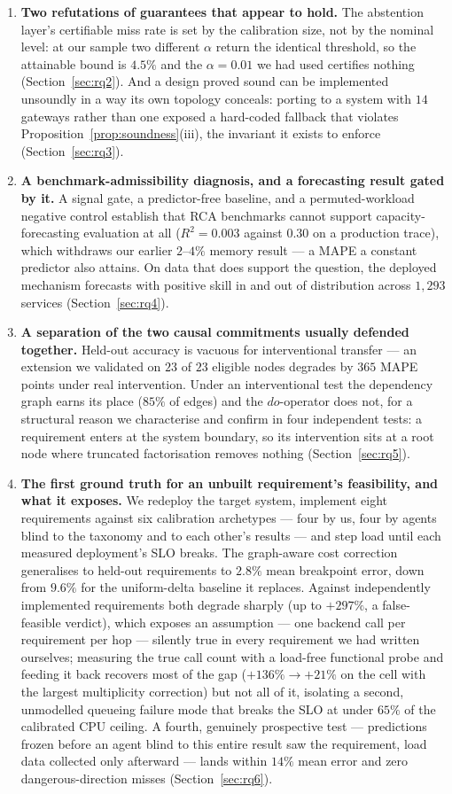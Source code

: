 \documentclass[journal, 10pt]{IEEEtran}
\begin{document}
\begin{enumerate}
    \item \textbf{Two refutations of guarantees that appear to hold.} The abstention layer's certifiable miss rate is set by the calibration size, not by the nominal level: at our sample two different $\alpha$ return the identical threshold, so the attainable bound is $4.5\%$ and the $\alpha=0.01$ we had used certifies nothing (Section~\ref{sec:rq2}). And a design proved sound can be implemented unsoundly in a way its own topology conceals: porting to a system with $14$ gateways rather than one exposed a hard-coded fallback that violates Proposition~\ref{prop:soundness}(iii), the invariant it exists to enforce (Section~\ref{sec:rq3}).
    \item \textbf{A benchmark-admissibility diagnosis, and a forecasting result gated by it.} A signal gate, a predictor-free baseline, and a permuted-workload negative control establish that RCA benchmarks cannot support capacity-forecasting evaluation at all ($R^2 = 0.003$ against $0.30$ on a production trace), which withdraws our earlier $2$--$4\%$ memory result --- a MAPE a constant predictor also attains. On data that does support the question, the deployed mechanism forecasts with positive skill in and out of distribution across $1{,}293$ services (Section~\ref{sec:rq4}).
    \item \textbf{A separation of the two causal commitments usually defended together.} Held-out accuracy is vacuous for interventional transfer --- an extension we validated on $23$ of $23$ eligible nodes degrades by $365$ MAPE points under real intervention. Under an interventional test the dependency graph earns its place ($85\%$ of edges) and the $do$-operator does not, for a structural reason we characterise and confirm in four independent tests: a requirement enters at the system boundary, so its intervention sits at a root node where truncated factorisation removes nothing (Section~\ref{sec:rq5}).
    \item \textbf{The first ground truth for an unbuilt requirement's feasibility, and what it exposes.} We redeploy the target system, implement eight requirements against six calibration archetypes --- four by us, four by agents blind to the taxonomy and to each other's results --- and step load until each measured deployment's SLO breaks. The graph-aware cost correction generalises to held-out requirements to $2.8\%$ mean breakpoint error, down from $9.6\%$ for the uniform-delta baseline it replaces. Against independently implemented requirements both degrade sharply (up to $+297\%$, a false-feasible verdict), which exposes an assumption --- one backend call per requirement per hop --- silently true in every requirement we had written ourselves; measuring the true call count with a load-free functional probe and feeding it back recovers most of the gap ($+136\%\to+21\%$ on the cell with the largest multiplicity correction) but not all of it, isolating a second, unmodelled queueing failure mode that breaks the SLO at under $65\%$ of the calibrated CPU ceiling. A fourth, genuinely prospective test --- predictions frozen before an agent blind to this entire result saw the requirement, load data collected only afterward --- lands within $14\%$ mean error and zero dangerous-direction misses (Section~\ref{sec:rq6}).

\end{enumerate}
\end{document}
